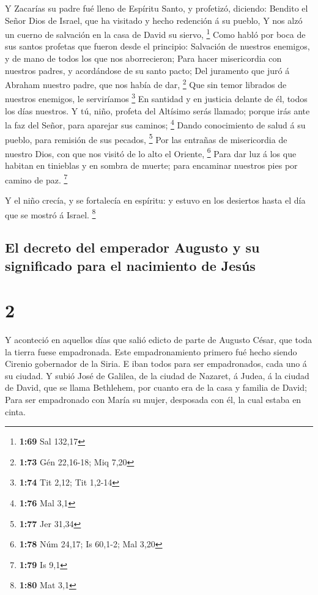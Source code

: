  Y Zacarías su padre fué lleno de Espíritu Santo, y
profetizó, diciendo:  Bendito el Señor Dios de Israel, que
ha visitado y hecho redención á su pueblo,  Y nos alzó un
cuerno de salvación en la casa de David su siervo, \footnote{\textbf{1:69}
  Sal 132,17}  Como habló por boca de sus santos profetas
que fueron desde el principio:  Salvación de nuestros
enemigos, y de mano de todos los que nos aborrecieron; 
Para hacer misericordia con nuestros padres, y acordándose de su santo
pacto;  Del juramento que juró á Abraham nuestro padre, que
nos había de dar, \footnote{\textbf{1:73} Gén 22,16-18; Miq 7,20}
 Que sin temor librados de nuestros enemigos, le
serviríamos \footnote{\textbf{1:74} Tit 2,12; Tit 1,2-14} 
En santidad y en justicia delante de él, todos los días nuestros.
 Y tú, niño, profeta del Altísimo serás llamado; porque
irás ante la faz del Señor, para aparejar sus caminos; \footnote{\textbf{1:76}
  Mal 3,1}  Dando conocimiento de salud á su pueblo, para
remisión de sus pecados, \footnote{\textbf{1:77} Jer 31,34}
 Por las entrañas de misericordia de nuestro Dios, con que
nos visitó de lo alto el Oriente, \footnote{\textbf{1:78} Núm 24,17; Is
  60,1-2; Mal 3,20}  Para dar luz á los que habitan en
tinieblas y en sombra de muerte; para encaminar nuestros pies por camino
de paz. \footnote{\textbf{1:79} Is 9,1}

 Y el niño crecía, y se fortalecía en espíritu: y estuvo en
los desiertos hasta el día que se mostró á Israel. \footnote{\textbf{1:80}
  Mat 3,1}

\hypertarget{el-decreto-del-emperador-augusto-y-su-significado-para-el-nacimiento-de-jesuxfas}{%
\subsection{El decreto del emperador Augusto y su significado para el
nacimiento de
Jesús}\label{el-decreto-del-emperador-augusto-y-su-significado-para-el-nacimiento-de-jesuxfas}}

\hypertarget{section-1}{%
\section{2}\label{section-1}}

 Y aconteció en aquellos días que salió edicto de parte de
Augusto César, que toda la tierra fuese empadronada.  Este
empadronamiento primero fué hecho siendo Cirenio gobernador de la Siria.
 E iban todos para ser empadronados, cada uno á su ciudad.
 Y subió José de Galilea, de la ciudad de Nazaret, á Judea,
á la ciudad de David, que se llama Bethlehem, por cuanto era de la casa
y familia de David;  Para ser empadronado con María su
mujer, desposada con él, la cual estaba en cinta.

